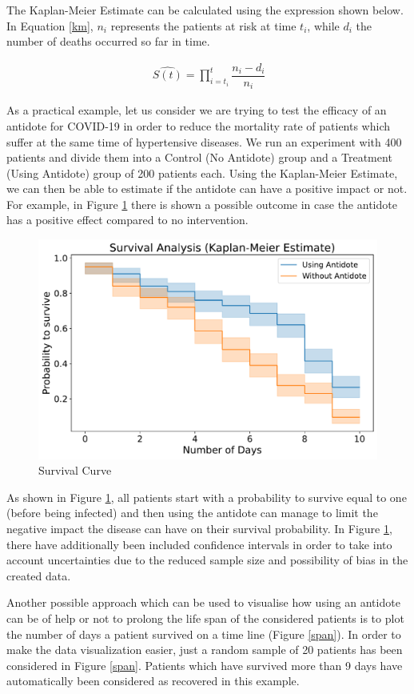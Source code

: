 The Kaplan-Meier Estimate can be calculated using the expression shown below. In Equation \ref{km}, $n_{i}$ represents the patients at risk at time $t_{i}$, while $d_{i}$ the number of deaths occurred so far in time.

\useshortskip
\begin{align}
\ \widehat{S(t)} = \prod_{i=t_{i}}^{t} \dfrac{n_{i}-d_{i}}{n_{i}}
\label{km}
\end{align}
\useshortskip

As a practical example, let us consider we are trying to test the efficacy of an antidote for COVID-19 in order to reduce the mortality rate of patients which suffer at the same time of hypertensive diseases. We run an experiment with 400 patients and divide them into a Control (No Antidote) group and a Treatment (Using Antidote) group of 200 patients each. Using the Kaplan-Meier Estimate, we can then be able to estimate if the antidote can have a positive impact or not. For example, in Figure \ref{s_curve} there is shown a possible outcome in case the antidote has a positive effect compared to no intervention.

\begin{figure}[ht!]%
    \centering
    \includegraphics[width=0.55\linewidth]{latex/images/survival.pdf}
    \vspace{-0.2cm}
    \caption{Survival Curve}
    \label{s_curve}
\end{figure}

As shown in Figure \ref{s_curve}, all patients start with a probability to survive equal to one (before being infected) and then using the antidote can manage to limit the negative impact the disease can have on their survival probability. In Figure \ref{s_curve}, there have additionally been included confidence intervals in order to take into account uncertainties due to the reduced sample size and possibility of bias in the created data.

Another possible approach which can be used to visualise how using an antidote can be of help or not to prolong the life span of the considered patients is to plot the number of days a patient survived on a time line (Figure \ref{span}). In order to make the data visualization easier, just a random sample of 20 patients has been considered in Figure \ref{span}. Patients which have survived more than 9 days have automatically been considered as recovered in this example.

